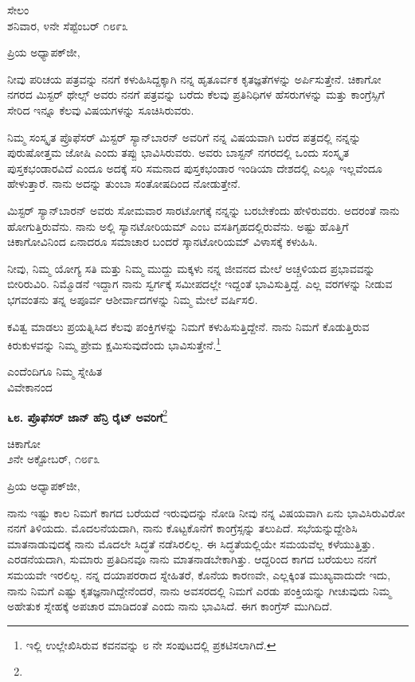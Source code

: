 \begin{flushright}
ಸೇಲಂ\\ಶನಿವಾರ, ೪ನೇ ಸೆಪ್ಟೆಂಬರ್ ೧೮೯೩
\end{flushright}

\noindent
ಪ್ರಿಯ ಅಧ್ಯಾಪಕ್‌ಜೀ,

ನೀವು ಪರಿಚಯ ಪತ್ರವನ್ನು ನನಗೆ ಕಳುಹಿಸಿದ್ದಕ್ಕಾಗಿ ನನ್ನ ಹೃತೂರ್ವಕ ಕೃತಜ್ಞತೆಗಳನ್ನು ಅರ್ಪಿಸುತ್ತೇನೆ. ಚಿಕಾಗೋ ನಗರದ ಮಿಸ್ಟರ್‌ ಥೇಲ್ಸ್ ಅವರು ನನಗೆ ಪತ್ರವನ್ನು ಬರೆದು ಕೆಲವು ಪ್ರತಿನಿಧಿಗಳ ಹೆಸರುಗಳನ್ನು ಮತ್ತು ಕಾಂಗ್ರೆಸ್ಸಿಗೆ ಸೇರಿದ ಇನ್ನೂ ಕೆಲವು ವಿಷಯಗಳನ್ನು ಸೂಚಿಸಿರುವರು.

ನಿಮ್ಮ ಸಂಸ್ಕೃತ ಪ್ರೊಫೆಸರ್ ಮಿಸ್ಟರ್ ಸ್ಯಾನ್‌ಬಾರನ್ ಅವರಿಗೆ ನನ್ನ ವಿಷಯವಾಗಿ ಬರೆದ ಪತ್ರದಲ್ಲಿ ನನ್ನನ್ನು ಪುರುಷೋತ್ತಮ ಜೋಷಿ ಎಂದು ತಪ್ಪು ಭಾವಿಸಿರುವರು. ಅವರು ಬಾಸ್ಟನ್ ನಗರದಲ್ಲಿ ಒಂದು ಸಂಸ್ಕೃತ ಪುಸ್ತಕಭಂಡಾರವಿದೆ ಎಂದೂ ಅದಕ್ಕೆ ಸರಿ ಸಮನಾದ ಪುಸ್ತಕಭಂಡಾರ ಇಂಡಿಯಾ ದೇಶದಲ್ಲಿ ಎಲ್ಲೂ ಇಲ್ಲವೆಂದೂ ಹೇಳುತ್ತಾರೆ. ನಾನು ಅದನ್ನು ತುಂಬಾ ಸಂತೋಷದಿಂದ ನೋಡುತ್ತೇನೆ.

ಮಿಸ್ಟರ್ ಸ್ಯಾನ್‌ಬಾರನ್ ಅವರು ಸೋಮವಾರ ಸಾರಟೋಗಕ್ಕೆ ನನ್ನನ್ನು ಬರಬೇಕೆಂದು ಹೇಳಿರುವರು. ಅದರಂತೆ ನಾನು ಹೋಗುತ್ತಿರುವೆನು. ನಾನು ಅಲ್ಲಿ ಸ್ಯಾನಟೋರಿಯಮ್ ಎಂಬ ವಸತಿಗೃಹದಲ್ಲಿರುವೆನು. ಅಷ್ಟು ಹೊತ್ತಿಗೆ ಚಿಕಾಗೋವಿನಿಂದ ಏನಾದರೂ ಸಮಾಚಾರ ಬಂದರೆ ಸ್ಕಾನಟೋರಿಯಮ್ ವಿಳಾಸಕ್ಕೆ ಕಳುಹಿಸಿ.

ನೀವು, ನಿಮ್ಮ ಯೋಗ್ಯ ಸತಿ ಮತ್ತು ನಿಮ್ಮ ಮುದ್ದು ಮಕ್ಕಳು ನನ್ನ ಜೀವನದ ಮೇಲೆ ಅಚ್ಚಳಿಯದ ಪ್ರಭಾವವನ್ನು ಬೀರಿರುವಿರಿ. ನಿಮ್ಮೊಡನೆ ಇದ್ದಾಗ ನಾನು ಸ್ವರ್ಗಕ್ಕೆ ಸಮೀಪದಲ್ಲೇ ಇದ್ದಂತೆ ಭಾವಿಸುತ್ತಿದ್ದೆ. ಎಲ್ಲ ವರಗಳನ್ನು ನೀಡುವ ಭಗವಂತನು ತನ್ನ ಅಪೂರ್ವ ಆಶೀರ್ವಾದಗಳನ್ನು ನಿಮ್ಮ ಮೇಲೆ ವರ್ಷಿಸಲಿ.

ಕವಿತ್ವ ಮಾಡಲು ಪ್ರಯತ್ನಿಸಿದ ಕೆಲವು ಪಂಕ್ತಿಗಳನ್ನು ನಿಮಗೆ ಕಳುಹಿಸುತ್ತಿದ್ದೇನೆ. ನಾನು ನಿಮಗೆ ಕೊಡುತ್ತಿರುವ ಕಿರುಕುಳವನ್ನು ನಿಮ್ಮ ಪ್ರೇಮ ಕ್ಷಮಿಸುವುದೆಂದು ಭಾವಿಸುತ್ತೇನೆ.\footnote{ಇಲ್ಲಿ ಉಲ್ಲೇಖಿಸಿರುವ ಕವನವನ್ನು ೮ ನೇ ಸಂಪುಟದಲ್ಲಿ ಪ್ರಕಟಿಸಲಾಗಿದೆ.}

{\flushright
ಎಂದೆಂದಿಗೂ ನಿಮ್ಮ ಸ್ನೇಹಿತ\\ವಿವೇಕಾನಂದ\par}

\eject

\begin{center}
\textbf{೬೮. ಪ್ರೊಫೆಸರ್ ಜಾನ್ ಹೆನ್ರಿ  ರೈಟ್ ಅವರಿಗೆ}\footnote{}
\end{center}
\vspace{-0.5cm}

\begin{flushright}
ಚಿಕಾಗೋ\\೨ನೇ ಅಕ್ಟೋಬರ್, ೧೮೯೩
\end{flushright}
\vspace{-0.5cm}

\noindent
ಪ್ರಿಯ ಅಧ್ಯಾಪಕ್‌ಜೀ,

ನಾನು ಇಷ್ಟು ಕಾಲ ನಿಮಗೆ ಕಾಗದ ಬರೆಯದೆ ಇರುವುದನ್ನು ನೋಡಿ ನೀವು ನನ್ನ ವಿಷಯವಾಗಿ ಏನು ಭಾವಿಸಿರುವಿರೋ ನನಗೆ ತಿಳಿಯದು. ಮೊದಲನೆಯದಾಗಿ, ನಾನು ಕೊಟ್ಟಕೊನೆಗೆ ಕಾಂಗ್ರೆಸ್ಸನ್ನು ತಲುಪಿದೆ. ಸಭೆಯನ್ನುದ್ದೇಶಿಸಿ ಮಾತನಾಡುವುದಕ್ಕೆ ನಾನು ಮೊದಲೇ ಸಿದ್ಧತೆ ನಡೆಸಿರಲಿಲ್ಲ. ಈ ಸಿದ್ಧತೆಯಲ್ಲಿಯೇ ಸಮಯವೆಲ್ಲ ಕಳೆಯುತ್ತಿತ್ತು. ಎರಡನೆಯದಾಗಿ, ಸುಮಾರು ಪ್ರತಿದಿನವೂ ನಾನು ಮಾತನಾಡಬೇಕಾಗಿತ್ತು. ಆದ್ದರಿಂದ ಕಾಗದ ಬರೆಯಲು ನನಗೆ ಸಮಯವೇ ಇರಲಿಲ್ಲ. ನನ್ನ ದಯಾಪರರಾದ ಸ್ನೇಹಿತರೆ, ಕೊನೆಯ ಕಾರಣವೇ, ಎಲ್ಲಕ್ಕಿಂತ ಮುಖ್ಯವಾದುದೇ ಇದು, ನಾನು ನಿಮಗೆ ಎಷ್ಟು ಕೃತಜ್ಞನಾಗಿದ್ದೇನೆಂದರೆ, ನಾನು ಅವಸರದಲ್ಲಿ ನಿಮಗೆ ಎರಡು ಪಂಕ್ತಿಯನ್ನು ಗೀಚುವುದು ನಿಮ್ಮ ಅಹೇತುಕ ಸ್ನೇಹಕ್ಕೆ ಅಪಚಾರ ಮಾಡಿದಂತೆ ಎಂದು ನಾನು ಭಾವಿಸಿದೆ. ಈಗ ಕಾಂಗ್ರೆಸ್ ಮುಗಿದಿದೆ.

